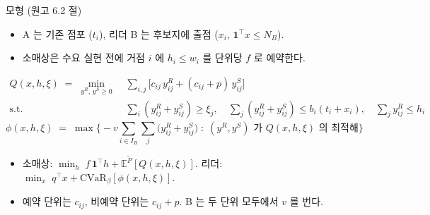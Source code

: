 \documentclass[aspectratio=169,11pt]{beamer}
\newcommand{\CVaR}{\mathrm{CVaR}}
\begin{document}
\begin{frame}{모형 (원고 6.2 절)}
\begin{itemize}
  \item A 는 기존 점포 ($t_i$), 리더 B 는 후보지에 출점 ($x_i$, $\mathbf{1}^\top x \le N_B$).
  \item 소매상은 수요 실현 전에 거점 $i$ 에 $h_i \le w_i$ 를 단위당 $f$ 로 예약한다.
\end{itemize}
\begin{equation*}
\begin{aligned}
Q(x,h,\xi) \;=\; \min_{y^{R},\,y^{S}\ge 0}\;& \textstyle\sum_{i,j}\big[c_{ij}\,y^{R}_{ij} + (c_{ij}+p)\,y^{S}_{ij}\big]\\
\text{s.t.}\;\;& \textstyle\sum_{i}(y^{R}_{ij}+y^{S}_{ij}) \ge \xi_j,\quad
\sum_{j}(y^{R}_{ij}+y^{S}_{ij}) \le b_i(t_i+x_i),\quad
\sum_{j} y^{R}_{ij} \le h_i
\end{aligned}
\end{equation*}
\begin{equation*}
\phi(x,h,\xi) \;=\; \max\Big\{-v\textstyle\sum_{i\in I_B}\sum_{j}\big(y^{R}_{ij}+y^{S}_{ij}\big) \;:\; (y^{R},y^{S}) \text{ 가 } Q(x,h,\xi) \text{ 의 최적해}\Big\}
\end{equation*}
\begin{itemize}
  \item 소매상: $\min_{h}\; f\,\mathbf{1}^\top h + \mathbb{E}^{\tilde P}[Q(x,h,\xi)]$. \quad 리더: $\min_{x}\; q^\top x + \CVaR_\beta[\phi(x,h,\xi)]$.
  \item 예약 단위는 $c_{ij}$, 비예약 단위는 $c_{ij}+p$. B 는 두 단위 모두에서 $v$ 를 번다.
\end{itemize}
\end{frame}
\end{document}
